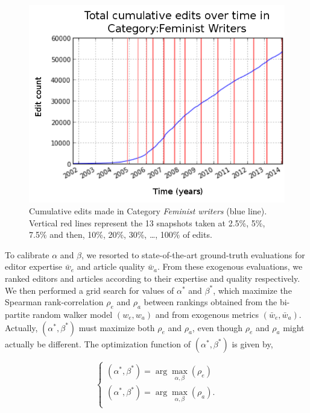 \begin{figure}[!t]
\centering
\includegraphics[width=0.9\columnwidth]{../Figures/cumulative_snapshots_Feminist_Writers_thirteen.png}
\caption{Cumulative edits made in Category {\it Feminist writers} (blue line). Vertical red lines represent the 13 snapshots taken at 2.5\%, 5\%, 7.5\% and then, 10\%, 20\%, 30\%, \ldots , 100\% of edits.}
\label{fig:snapshots}
\end{figure}

To calibrate $\alpha$ and $\beta$, we resorted to state-of-the-art ground-truth evaluations for editor expertise $\bar{w}_e$ and article quality $\bar{w}_a$. From these exogenous evaluations, we ranked editors and articles according to their expertise and quality respectively. We then performed  a grid search for values of $\alpha^*$ and $\beta^*$, which maximize the Spearman rank-correlation $\rho_e$ and $\rho_a$ between rankings obtained from the bi-partite random walker model $(w_e,w_a)$ and from exogenous metrics $(\bar{w}_e,\bar{w}_a)$. Actually, $(\alpha^*,\beta^*)$ must maximize both $\rho_e$ and $\rho_a$, even though $\rho_e$ and $\rho_a$ might actually be different. The optimization function  of $(\alpha^*,\beta^*)$ is given by,

\newcommand{\argmax}{\arg\!\max}

\begin{equation}
\begin{cases}
(\alpha^*,\beta^*) = \argmax_{\alpha, \beta}(\rho_e)\\
(\alpha^*,\beta^*) =\argmax_{\alpha, \beta}(\rho_a).\\
\end{cases}
\end{equation}

